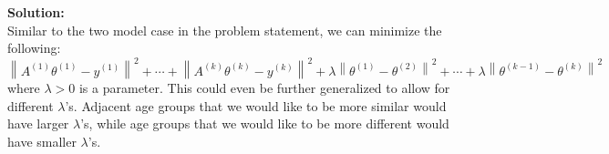 \begin{enumerate}[label=(\alph*)]
\begin{enumerate}[label=(\alph*)]
		            \begin{tcolorbox}
			            \textbf{Solution:} \\
			            Similar to the two model case in the problem statement,
			            we can minimize the following:
			            $$
				            \left\| A^{(1)} \theta^{(1)} - y^{(1)} \right\|^2 +
				            \cdots +
				            \left\| A^{(k)} \theta^{(k)} - y^{(k)} \right\|^2 +
				            \lambda \left\| \theta^{(1)} - \theta^{(2)} \right\|^2 +
				            \cdots +
				            \lambda \left\| \theta^{(k - 1)} - \theta^{(k)} \right\|^2
			            $$
			            where $\lambda > 0$ is a parameter. This could even be
			            further generalized to allow for different $\lambda$'s.
			            Adjacent age groups that we would like to be more
			            similar would have larger $\lambda$'s, while age groups
			            that we would like to be more different would have
			            smaller $\lambda$'s.
		            \end{tcolorbox}
	      \end{enumerate}
\end{enumerate}
